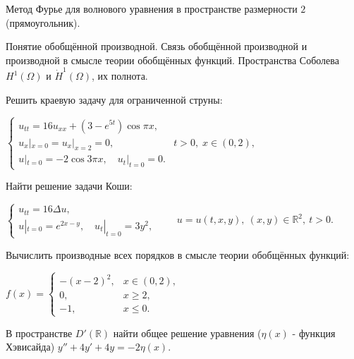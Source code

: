 
\begin{cond}
	Метод Фурье для волнового уравнения в пространстве размерности $2$ (прямоугольник).
\end{cond}

\begin{cond}
	Понятие обобщённой производной. Связь обобщённой производной и производной в смысле теории обобщённых функций. Пространства Соболева $H^1(\Omega)$ и $\dot{H}^1(\Omega)$, их полнота.
\end{cond}

\begin{cond}
	Решить краевую задачу для ограниченной струны:

	\(
	\begin{cases}
		u_{tt} = 16u_{xx} + (3 - e^{5t})\cos \pi x,          \\
		u_x|_{x=0} = u_x|_{x=2} = 0, & t > 0,\; x \in (0,2), \\
		u|_{t=0} = -2\cos 3\pi x,\quad u_t|_{t=0} = 0.
	\end{cases}
	\)
\end{cond}

\begin{cond}
	Найти решение задачи Коши:

	\(
	\begin{cases}
		u_{tt} = 16\Delta u, \\
		u|_{t=0} = e^{2x - y},\quad u_t|_{t=0} = 3y^2,
	\end{cases}
	\qquad
	u = u(t,x,y),\ (x,y)\in\mathbb{R}^2,\ t>0.
	\)
\end{cond}

\begin{cond}
	Вычислить производные всех порядков в смысле теории обобщённых функций:

	\(
	f(x) =
	\begin{cases}
		-(x - 2)^2, & x \in (0,2), \\
		0,          & x \ge 2,     \\
		-1,         & x \le 0.
	\end{cases}
	\)
\end{cond}

\begin{cond}
	В пространстве \(D'(\mathbb{R})\) найти общее решение уравнения
	($\eta(x)$ - функция Хэвисайда)
	$y'' + 4y' + 4y = -2\eta(x)$.
\end{cond}
